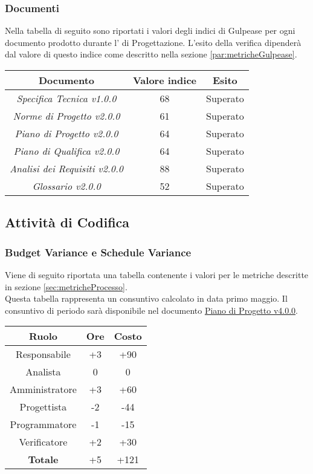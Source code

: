 \documentclass{scalatekids-article}
\begin{document}
\subsubsection{Documenti}
Nella tabella di seguito sono riportati i valori degli indici di Gulpease per ogni documento prodotto durante l' di Progettazione. L'esito della verifica dipenderà dal valore di questo indice come descritto nella sezione \ref{par:metricheGulpease}.
\begin{center}
  \begin{tabular}{| c | c | c |}
    \hline
    Documento & Valore indice & Esito\\
    \hline
    \textit{Specifica Tecnica v1.0.0} & 68 & Superato\\
    \textit{Norme di Progetto v2.0.0} & 61 & Superato\\
    \textit{Piano di Progetto v2.0.0} & 64 & Superato\\
    \textit{Piano di Qualifica v2.0.0} & 64 & Superato\\
    \textit{Analisi dei Requisiti v2.0.0} & 88 & Superato\\
    \textit{Glossario v2.0.0} & 52 & Superato\\
    \hline
  \end{tabular}
\end{center}

\subsection{Attività di Codifica}

\subsubsection{Budget Variance e Schedule Variance}
Viene di seguito riportata una tabella contenente i valori per le metriche descritte in sezione \ref{sec:metricheProcesso}.\\ Questa tabella rappresenta un consuntivo calcolato in data primo maggio. Il consuntivo di periodo sarà disponibile nel documento \href{run:./PianoDiProgetto\_v4.0.0.pdf}{Piano di Progetto v4.0.0}.
\begin{center}
  \normalsize
  \begin{tabular}{| c | c | c |}
    \hline
    \textbf{Ruolo} & \textbf{Ore} & \textbf{Costo}\\
    \hline
    Responsabile & +3 & +90\\ %
    Analista & 0 & 0\\ %
    Amministratore & +3 & +60\\ %
    Progettista & -2 & -44\\ %
    Programmatore & -1 & -15\\ %
    Verificatore & +2 & +30\\ %
    \hline
    \textbf{Totale} & +5 & +121\\
    \hline
  \end{tabular}
\end{center}
\end{document}
